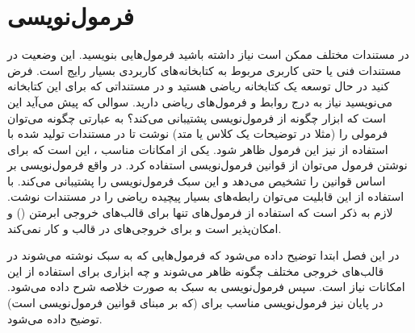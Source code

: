 
\chapter{فرمول‌نویسی}

در مستندات مختلف ممکن است نیاز داشته باشید فرمول‌هایی بنویسید. این وضعیت در
مستندات فنی یا حتی کاربری مربوط به کتابخانه‌های کاربردی بسیار رایج است. فرض کنید
در حال توسعه یک کتابخانه ریاضی هستید و در مستنداتی که برای این کتابخانه
می‌نویسید نیاز به درج روابط و فرمول‌های ریاضی دارید. سوالی که پیش می‌آید این است
که ابزار  چگونه از فرمول‌نویسی پشتیبانی می‌کند؟ به عبارتی چگونه
می‌توان فرمولی را (مثلا در توضیحات یک کلاس یا متد) نوشت تا در مستندات تولید شده
با استفاده از  نیز این فرمول ظاهر شود.
یکی از امکانات مناسب ، این است که برای نوشتن فرمول می‌توان از قوانین
فرمول‌نویسی \lr{\LaTeX} استفاده کرد. در واقع  فرمول‌نویسی بر اساس قوانین
\lr{\LaTeX} را تشخیص می‌دهد و این سبک فرمول‌نویسی را پشتیبانی می‌کند.
با استفاده از این قابلیت می‌توان رابطه‌های بسیار پیچیده ریاضی را در مستندات
نوشت. لازم به ذکر است که استفاده از فرمول‌های \lr{\LaTeX} تنها برای قالب‌های خروجی
ابرمتن () و \lr{\LaTeX} امکان‌پذیر است و برای خروجی‌های در قالب  و
 کار نمی‌کند.

در این فصل ابتدا توضیح داده می‌شود که فرمول‌هایی که به سبک \lr{\LaTeX} نوشته می‌شوند
در قالب‌های خروجی مختلف چگونه ظاهر می‌شوند و چه ابزاری برای استفاده از این
امکانات نیاز است. سپس فرمول‌نویسی به سبک \lr{\LaTeX} به صورت خلاصه شرح داده می‌شود.
در پایان نیز فرمول‌نویسی مناسب برای  (که بر مبنای قوانین فرمول‌نویسی
\lr{\LaTeX} است) توضیح داده می‌شود.




